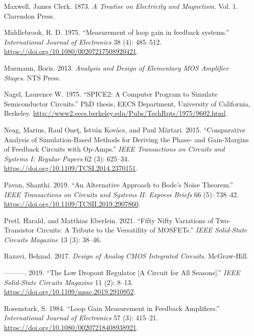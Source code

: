 \documentclass[
  a4paper,
  DIV=11,
  numbers=noendperiod]{scrartcl}
\newlength{\cslhangindent}
\newenvironment{CSLReferences}[2] %
 {\begin{list}{}{%
  \setlength{\itemindent}{0pt}
  \setlength{\leftmargin}{0pt}
  \setlength{\parsep}{0pt}
  \ifodd #1
   \setlength{\leftmargin}{\cslhangindent}
   \setlength{\itemindent}{-1\cslhangindent}
  \fi
  \setlength{\itemsep}{#2\baselineskip}}}
 {\end{list}}
\begin{document}
\begin{CSLReferences}{1}{0}
Maxwell, James Clerk. 1873. \emph{A Treatise on Electricity and
Magnetism}. Vol. 1. Clarendon Press.

Middlebrook, R. D. 1975. {``{Measurement of loop gain in feedback
systems}.''} \emph{International Journal of Electronics} 38 (4):
485--512. \url{https://doi.org/10.1080/00207217508920421}.

Murmann, Boris. 2013. \emph{{Analysis and Design of Elementary MOS
Amplifier Stages}}. NTS Press.

Nagel, Laurence W. 1975. {``SPICE2: A Computer Program to Simulate
Semiconductor Circuits.''} PhD thesis, EECS Department, University of
California, Berkeley.
\url{http://www2.eecs.berkeley.edu/Pubs/TechRpts/1975/9602.html}.

Neag, Marius, Raul Oneţ, István Kovács, and Paul Mărtari. 2015.
{``Comparative Analysis of Simulation-Based Methods for Deriving the
Phase- and Gain-Margins of Feedback Circuits with Op-Amps.''} \emph{IEEE
Transactions on Circuits and Systems I: Regular Papers} 62 (3): 625--34.
\url{https://doi.org/10.1109/TCSI.2014.2370151}.

Pavan, Shanthi. 2019. {``An Alternative Approach to Bode's Noise
Theorem.''} \emph{IEEE Transactions on Circuits and Systems II: Express
Briefs} 66 (5): 738--42.
\url{https://doi.org/10.1109/TCSII.2019.2907860}.

Pretl, Harald, and Matthias Eberlein. 2021. {``Fifty Nifty Variations of
Two-Transistor Circuits: A Tribute to the Versatility of MOSFETs.''}
\emph{IEEE Solid-State Circuits Magazine} 13 (3): 38--46.

Razavi, Behzad. 2017. \emph{{Design of Analog CMOS Integrated
Circuits}}. McGraw-Hill.

---------. 2019. {``{The Low Dropout Regulator {[}A Circuit for All
Seasons{]}}.''} \emph{IEEE Solid-State Circuits Magazine} 11 (2): 8--13.
\url{https://doi.org/10.1109/mssc.2019.2910952}.

Rosenstark, S. 1984. {``Loop Gain Measurement in Feedback Amplifiers.''}
\emph{International Journal of Electronics} 57 (3): 415--21.
\url{https://doi.org/10.1080/00207218408938921}.


\end{CSLReferences}
\end{document}
